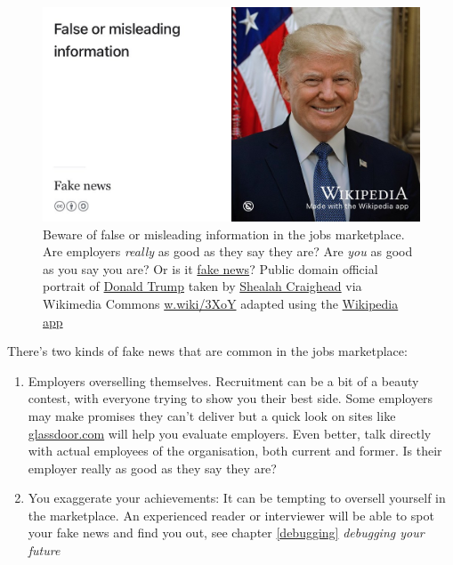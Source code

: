 \documentclass[
]{book}
\providecommand{\tightlist}{%
  \setlength{\itemsep}{0pt}\setlength{\parskip}{0pt}}
\begin{document}
\begin{figure}

{\centering \includegraphics[width=0.98\linewidth]{images/fakenews} 

}

\caption{Beware of false or misleading information in the jobs marketplace. Are employers \emph{really} as good as they say they are? Are \emph{you} as good as you say you are? Or is it \href{https://en.wikipedia.org/wiki/Fake_news}{fake news}? Public domain official portrait of \href{https://en.wikipedia.org/wiki/Donald_Trump}{Donald Trump} taken by \href{https://en.wikipedia.org/wiki/Shealah_Craighead}{Shealah Craighead} via Wikimedia Commons \href{https://w.wiki/3XoY}{w.wiki/3XoY} adapted using the \href{https://apps.apple.com/us/app/wikipedia/id324715238}{Wikipedia app}}\label{fig:fakenews-fig}
\end{figure}



There's two kinds of fake news that are common in the jobs marketplace:

\begin{enumerate}
\def\labelenumi{\arabic{enumi}.}
\tightlist
\item
  Employers overselling themselves. Recruitment can be a bit of a beauty contest, with everyone trying to show you their best side. Some employers may make promises they can't deliver but a quick look on sites like \href{https://www.glassdoor.com}{glassdoor.com} will help you evaluate employers. Even better, talk directly with actual employees of the organisation, both current and former. Is their employer really as good as they say they are?
\item
  You exaggerate your achievements: It can be tempting to oversell yourself in the marketplace. An experienced reader or interviewer will be able to spot your fake news and find you out, see chapter \ref{debugging} \emph{debugging your future}
\end{enumerate}
\end{document}
